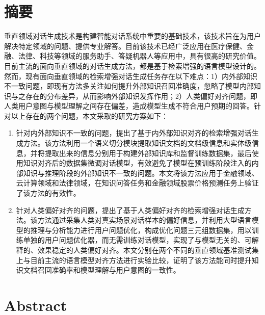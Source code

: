 \chapter{摘\texorpdfstring{\quad}{}要}

垂直领域对话生成技术是构建智能对话系统中重要的基础技术，该技术旨在为用户解决特定领域的问题、提供专业解答。目前该技术已经广泛应用在医疗保健、金融、法律、科技等领域的服务助手、答疑机器人等应用中，具有很高的研究价值。目前主流的面向垂直领域的对话生成方法，都是基于检索增强的语言模型设计的。然而，现有面向垂直领域的检索增强对话生成任务存在以下难点：1）内外部知识不一致问题，即现有方法多关注如何提升外部知识召回准确度，忽略了模型内部知识与之存在的分布差异，从而影响外部知识发挥作用；2）人类偏好对齐问题，即人类用户意图与模型理解之间存在偏差，造成模型生成不符合用户预期的回答。针对以上存在的两个问题，本文采取的研究方案如下：

\begin{enumerate}[topsep = 0 pt, itemsep= 0 pt, parsep=0pt, partopsep=0pt, leftmargin=0pt, itemindent=44pt, labelsep=6pt, listparindent=24pt, label=\arabic*)]
	\item 针对内外部知识不一致的问题，提出了基于内外部知识对齐的检索增强对话生成方法。该方法利用一个语义切分模块提取知识文档的文档级信息和实体级信息，并将提取出来的信息分别用于构建外部知识库和监督训练数据集，最后使用知识对齐后的数据集微调对话模型，有效避免了模型在预训练阶段注入的内部知识与推理阶段的外部知识不一致的问题。本文将该方法应用于金融领域、云计算领域和法律领域，在知识问答任务和金融领域股票价格预测任务上验证了该方法的有效性。

	\item 针对人类偏好对齐的问题，提出了基于人类偏好对齐的检索增强对话生成方法。该方法通过采集人类对真实场景对话样本的偏好信息，并利用大型语言模型的推理与分析能力进行用户问题优化，构成优化问题三元组数据集，用以训练单独的用户问题优化器，而无需训练对话模型，实现了与模型无关的、可解释的、效果稳定的人类偏好对齐。本文分别在两个不同的垂直领域基准测试集上与目前主流的语言模型对齐方法进行实验比较，证明了该方法能同时提升知识文档召回准确率和模型理解与用户意图的一致性。
\end{enumerate}


\chapter{Abstract}

